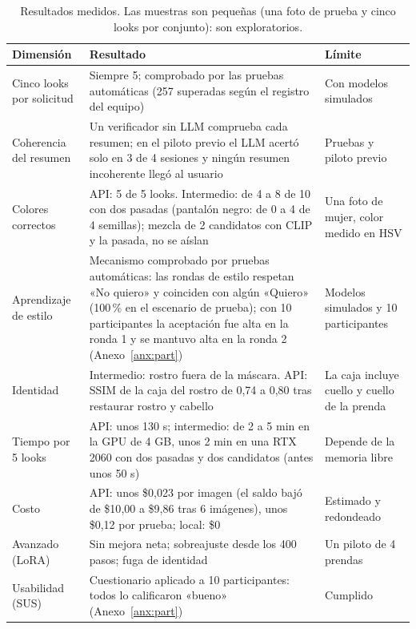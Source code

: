 \documentclass[11pt,letterpaper]{article}
\begin{document}
\begin{table}[H]
\centering
\caption{Resultados medidos. Las muestras son pequeñas (una foto de prueba y cinco looks por conjunto): son exploratorios.}
\small
\begin{tabularx}{\textwidth}{@{}p{3.2cm}Lp{3.0cm}@{}}
\toprule
\textbf{Dimensión} & \textbf{Resultado} & \textbf{Límite} \\
\midrule
Cinco looks por solicitud & Siempre 5; comprobado por las pruebas automáticas (257 superadas según el registro del equipo) & Con modelos simulados \\
Coherencia del resumen & Un verificador sin LLM comprueba cada resumen; en el piloto previo el LLM acertó solo en 3 de 4 sesiones y ningún resumen incoherente llegó al usuario & Pruebas y piloto previo \\
Colores correctos & API: 5 de 5 looks. Intermedio: de 4 a 8 de 10 con dos pasadas (pantalón negro: de 0 a 4 de 4 semillas); mezcla de 2 candidatos con CLIP y la pasada, no se aíslan & Una foto de mujer, color medido en HSV \\
Aprendizaje de estilo & Mecanismo comprobado por pruebas automáticas: las rondas de estilo respetan «No quiero» y coinciden con algún «Quiero» (100\,\% en el escenario de prueba); con 10 participantes la aceptación fue alta en la ronda 1 y se mantuvo alta en la ronda 2 (Anexo~\ref{anx:part}) & Modelos simulados y 10 participantes \\
Identidad & Intermedio: rostro fuera de la máscara. API: SSIM de la caja del rostro de 0,74 a 0,80 tras restaurar rostro y cabello & La caja incluye cuello y cuello de la prenda \\
Tiempo por 5 looks & API: unos 130 s; intermedio: de 2 a 5 min en la GPU de 4 GB, unos 2 min en una RTX 2060 con dos pasadas y dos candidatos (antes unos 50 s) & Depende de la memoria libre \\
Costo & API: unos \$0{,}023 por imagen (el saldo bajó de \$10{,}00 a \$9{,}86 tras 6 imágenes), unos \$0{,}12 por prueba; local: \$0 & Estimado y redondeado \\
Avanzado (LoRA) & Sin mejora neta; sobreajuste desde los 400 pasos; fuga de identidad & Un piloto de 4 prendas \\
Usabilidad (SUS) & Cuestionario aplicado a 10 participantes: todos lo calificaron «bueno» (Anexo~\ref{anx:part}) & Cumplido \\
\bottomrule
\end{tabularx}
\end{table}
\end{document}
